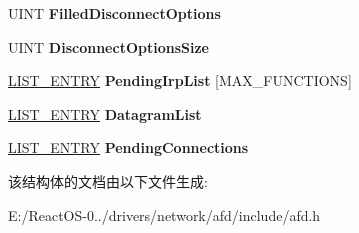 \begin{DoxyCompactItemize}
\item 
\mbox{\label{struct___a_f_d___f_c_b_ad4d1b4a1105ba63edbe3acffe2943dd1}} 
U\+I\+NT {\bfseries Filled\+Disconnect\+Options}
\item 
\mbox{\label{struct___a_f_d___f_c_b_a33d415bacd704c8aa9f5f98fbff09dc0}} 
U\+I\+NT {\bfseries Disconnect\+Options\+Size}
\item 
\mbox{\label{struct___a_f_d___f_c_b_a4b137b903a7ba545dffc0f5676f7197d}} 
\hyperlink{struct___l_i_s_t___e_n_t_r_y}{L\+I\+S\+T\+\_\+\+E\+N\+T\+RY} {\bfseries Pending\+Irp\+List} \mbox{[}M\+A\+X\+\_\+\+F\+U\+N\+C\+T\+I\+O\+NS\mbox{]}
\item 
\mbox{\label{struct___a_f_d___f_c_b_a2524033eef8d8dddccc4d55e6bd10cb9}} 
\hyperlink{struct___l_i_s_t___e_n_t_r_y}{L\+I\+S\+T\+\_\+\+E\+N\+T\+RY} {\bfseries Datagram\+List}
\item 
\mbox{\label{struct___a_f_d___f_c_b_aee55e7fda058887d4af76507ad98185e}} 
\hyperlink{struct___l_i_s_t___e_n_t_r_y}{L\+I\+S\+T\+\_\+\+E\+N\+T\+RY} {\bfseries Pending\+Connections}
\end{DoxyCompactItemize}


该结构体的文档由以下文件生成\+:\begin{DoxyCompactItemize}
\item 
E\+:/\+React\+O\+S-\/0../drivers/network/afd/include/afd.\+h\end{DoxyCompactItemize}
